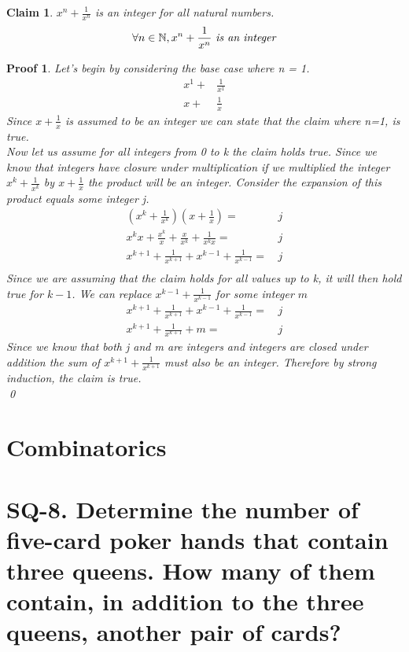 \documentclass{article}
\newtheorem*{claim}{Claim}
\newtheorem*{poof}{Proof}
\begin{document}
\begin{claim}
     $x^n+\frac{1}{x^n}$ is an integer for all natural numbers.
     \[\forall n \in \mathbb{N}, x^n +\frac{1}{x^n}\text{ \emph{is an integer}}\]
\end{claim}
\begin{poof}
     Let's begin by considering the base case where n = 1.
    \begin{align*}
         x^1+&\frac{1}{x^1}\\         x+&\frac{1}{x}
    \end{align*}
    Since $x+\frac{1}{x}$ is assumed to be an integer we can state that the claim where n=1, is true.
    \\
    
    \noindent Now let us assume for all integers from 0 to k the claim holds true. Since we know that integers have closure under multiplication if we multiplied the integer $x^k+\frac{1}{x^k}$ by $x+\frac{1}{x}$ the product will be an integer. Consider the expansion of this product equals some integer j.
    \begin{align*}
        (x^k+\frac{1}{x^k})(x+\frac{1}{x})=&\,j\\
        x^{k}x+\frac{x^k}{x}+\frac{x}{x^k}+\frac{1}{x^{k}x}=&\,j\\
        x^{k+1}+\frac{1}{x^{k+1}}+x^{k-1}+\frac{1}{x^{k-1}}=&\,j\\
    \end{align*}
    Since we are assuming that the claim holds for all values up to k, it will then hold true for $k-1$. We can replace $x^{k-1}+\frac{1}{x^{k-1}}$ for some integer $m$
    \begin{align*}
        x^{k+1}+\frac{1}{x^{k+1}}+x^{k-1}+\frac{1}{x^{k-1}}=&\,j\\
        x^{k+1}+\frac{1}{x^{k+1}}+m=&\,j
    \end{align*}
    Since we know that both j and m are integers and integers are closed under addition the sum of $x^{k+1}+\frac{1}{x^{k+1}}$ must also be an integer. Therefore by strong induction, the claim is true.
    \\
    \qed\end{poof}
\newpage
\section*{Combinatorics}
\section*{SQ-8. Determine the number of five-card poker hands that contain three queens. How many of them contain, in addition to the three queens, another pair of cards?}
\end{document}
